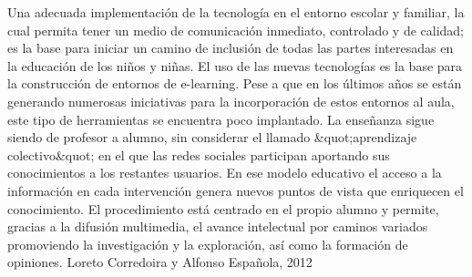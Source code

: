 Una adecuada implementación de la tecnología en el entorno escolar y familiar, la cual
permita tener un medio de comunicación inmediato, controlado y de calidad; es la base para
iniciar un camino de inclusión de todas las partes interesadas en la educación de los niños y
niñas.
El uso de las nuevas tecnologías es la base para la construcción de entornos de e-learning.
Pese a que en los últimos años se están generando numerosas iniciativas para la incorporación de
estos entornos al aula, este tipo de herramientas se encuentra poco implantado. La enseñanza
sigue siendo de profesor a alumno, sin considerar el llamado \&quot;aprendizaje colectivo\&quot; en el que
las redes sociales participan aportando sus conocimientos a los restantes usuarios. En ese modelo
educativo el acceso a la información en cada intervención genera nuevos puntos de vista que
enriquecen el conocimiento. El procedimiento está centrado en el propio alumno y permite,
gracias a la difusión multimedia, el avance intelectual por caminos variados promoviendo la
investigación y la exploración, así como la formación de opiniones. Loreto Corredoira y
Alfonso Española, 2012  
